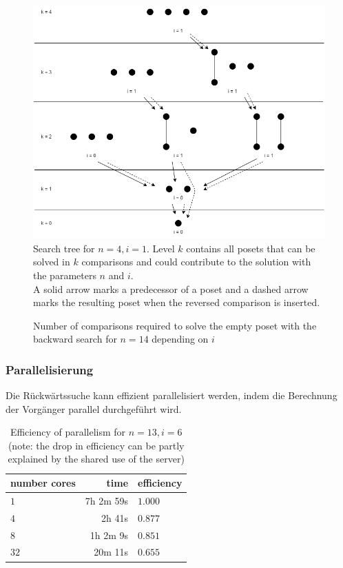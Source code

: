 \documentclass[10pt,journal,compsoc]{IEEEtran}
\begin{document}
\begin{figure}
  \centering
  \includegraphics[width=\columnwidth]{figures/backward-search-tree.png}
  \caption{Search tree for $n = 4, i = 1$.
    Level $k$ contains all posets that can be solved in $k$ comparisons and could contribute to the solution with the parameters $n$ and $i$. \\
    A solid arrow marks a predecessor of a poset and a dashed arrow marks the resulting poset when the reversed comparison is inserted.}
  \label{fig:backward-search-tree}
\end{figure}


\begin{figure}
  \centering
  
  \caption{Number of comparisons required to solve the empty poset with the backward search for $n = 14$ depending on $i$}
  \label{fig:backward-posets-per-level}
\end{figure}

\subsubsection{Parallelisierung} \label{sec:backward:parallelisation}
Die Rückwärtssuche kann effizient parallelisiert werden, indem die Berechnung der Vorgänger parallel durchgeführt wird.

\begin{table}
  \begin{tabular}{l|r|l}
    number cores & time      & efficiency \\
    \hline
    $1$          & 7h 2m 59s & $1.000$    \\
    $4$          & 2h 41s    & $0.877$    \\
    $8$          & 1h 2m 9s  & $0.851$    \\
    $32$         & 20m 11s   & $0.655$    \\
  \end{tabular}
  \centering
  \caption{Efficiency of parallelism for $n = 13, i = 6$ (note: the drop in efficiency can be partly explained by the shared use of the server)}
  \label{table:backward-parallel}
\end{table}
\end{document}
